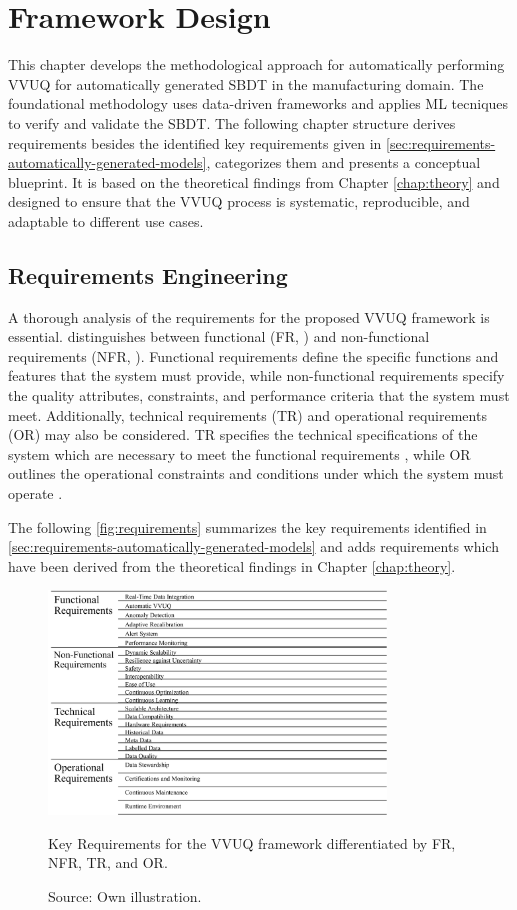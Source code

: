 \chapter{Framework Design}
\label{chap:methodology}
This chapter develops the methodological approach for automatically performing VVUQ for automatically generated SBDT in the manufacturing domain. The foundational methodology uses data-driven frameworks and applies ML tecniques to verify and validate the SBDT. The following chapter structure derives requirements besides the identified key requirements given in \autoref{sec:requirements-automatically-generated-models}, categorizes them and presents a conceptual blueprint. It is based on the theoretical findings from Chapter \ref{chap:theory} and designed to ensure that the VVUQ process is systematic, reproducible, and adaptable to different use cases.

\section{Requirements Engineering}
A thorough analysis of the requirements for the proposed VVUQ framework is essential. \Autocite{sindhgatta2005functional} distinguishes between functional (FR, \autocite{van2001goal}) and non-functional requirements (NFR, \autocite{glinz2005rethinking}). Functional requirements define the specific functions and features that the system must provide, while non-functional requirements specify the quality attributes, constraints, and performance criteria that the system must meet. Additionally, technical requirements (TR) and operational requirements (OR) may also be considered. TR specifies the technical specifications of the system which are necessary to meet the functional requirements \autocite{chikh2012new}, while OR outlines the operational constraints and conditions under which the system must operate \autocite{incose2023incose}.

The following \autoref{fig:requirements} summarizes the key requirements identified in \autoref{sec:requirements-automatically-generated-models} and adds requirements which have been derived from the theoretical findings in Chapter \ref{chap:theory}.

\begin{figure}[htbp]
  \centering
  \includegraphics[width=0.8\textwidth]{figures/req.png}
  \caption{Key Requirements for the VVUQ framework differentiated by FR, NFR, TR, and OR. }
  \caption*{Source: Own illustration.}
  \label{fig:requirements}
\end{figure}

